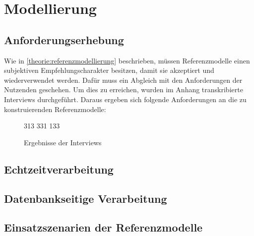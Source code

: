 \chapter{Modellierung}
\section{Anforderungserhebung}
Wie in \autoref{theorie:referenzmodellierung} beschrieben, müssen Referenzmodelle einen subjektiven Empfehlungscharakter besitzen, damit sie akzeptiert und wiederverwendet werden. Dafür muss ein Abgleich mit den Anforderungen der Nutzenden geschehen. Um dies zu erreichen, wurden im Anhang transkribierte Interviews  durchgeführt. Daraus ergeben sich folgende Anforderungen an die zu konstruierenden Referenzmodelle:

\begin{figure}[H]
\centering
\spideroverview
{3}{1}{3}
{3}{3}{1}
{1}{3}{3}
\caption{Ergebnisse der Interviews}
\label{abb:DimensionenUebersicht}
\end{figure}
\section{Echtzeitverarbeitung}

\section{Datenbankseitige Verarbeitung}

\section{Einsatzszenarien der Referenzmodelle}